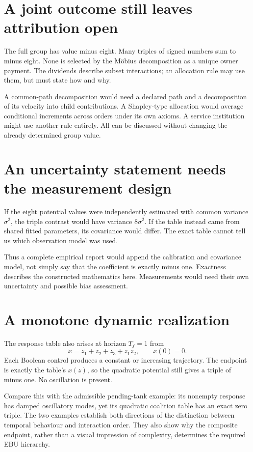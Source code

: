 \section{A joint outcome still leaves attribution open}
The full group has value minus eight. Many triples of signed numbers sum to minus eight. None is selected by the Möbius decomposition as a unique owner payment. The dividends describe subset interactions; an allocation rule may use them, but must state how and why.

A common-path decomposition would need a declared path and a decomposition of its velocity into child contributions. A Shapley-type allocation would average conditional increments across orders under its own axioms. A service institution might use another rule entirely. All can be discussed without changing the already determined group value.

\section{An uncertainty statement needs the measurement design}
If the eight potential values were independently estimated with common variance $\sigma^2$, the triple contrast would have variance $8\sigma^2$. If the table instead came from shared fitted parameters, its covariance would differ. The exact table cannot tell us which observation model was used.

Thus a complete empirical report would append the calibration and covariance model, not simply say that the coefficient is exactly minus one. Exactness describes the constructed mathematics here. Measurements would need their own uncertainty and possible bias assessment.

\section{A monotone dynamic realization}
The response table also arises at horizon $T_f=1$ from
\begin{equation}
 \dot x=z_1+z_2+z_3+z_1z_2,\qquad x(0)=0.
\end{equation}
Each Boolean control produces a constant or increasing trajectory. The endpoint is exactly the table's $x(z)$, so the quadratic potential still gives a triple of minus one. No oscillation is present.

Compare this with the admissible pending-tank example: its nonempty response has damped oscillatory modes, yet its quadratic coalition table has an exact zero triple. The two examples establish both directions of the distinction between temporal behaviour and interaction order. They also show why the composite endpoint, rather than a visual impression of complexity, determines the required EBU hierarchy.

